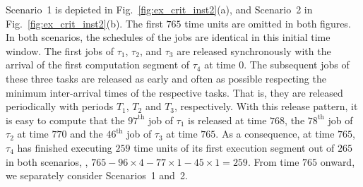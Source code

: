 Scenario~1 is depicted in Fig.~\ref{fig:ex_crit_inst2}(a), and Scenario~2 in Fig.~\ref{fig:ex_crit_inst2}(b). The first $765$ time units are omitted in both figures. In both scenarios, the schedules of the jobs are identical in this initial time window.  
The first jobs of $\tau_1$, $\tau_2$, and $\tau_3$ are released synchronously with the arrival of the first computation segment of $\tau_4$ at time $0$. The subsequent jobs of these three tasks are released as early and often as possible respecting the minimum inter-arrival times of the respective tasks. That is, they are released periodically with periods $T_1$, $T_2$ and $T_3$, respectively. With this release pattern, it is easy to compute that the $97^\text{th}$ job of $\tau_1$ is released at time $768$, the $78^\text{th}$ job of $\tau_2$ at time $770$ and the $46^\text{th}$ job of $\tau_3$ at time $765$. As a consequence, at time $765$, $\tau_4$ has finished executing $259$ time units of its first execution segment out of $265$ in both scenarios, \ie, $765 - 96 \times 4 - 77 \times 1 - 45 \times 1 = 259$.  From time $765$ onward, we separately consider Scenarios~1 and~2.

